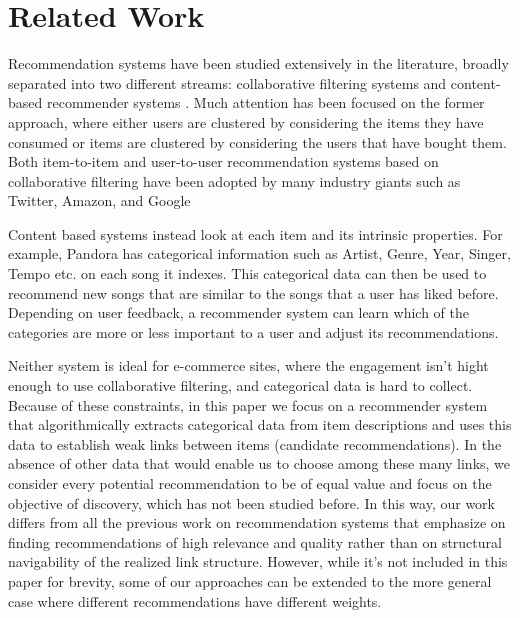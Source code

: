 \section{Related Work}

Recommendation systems have been studied extensively in the literature, %
broadly separated into two different streams: collaborative filtering systems and content-based recommender systems \cite{almazro2010survey}. Much attention has been focused on the former approach, where either users are clustered by considering the items they have consumed or items are clustered by considering the users that have bought them. Both item-to-item and user-to-user recommendation systems based on collaborative filtering have been adopted by many industry giants such as Twitter, %
Amazon, %
and Google %
\vs

Content based systems instead look at each item and its intrinsic properties. For example, Pandora has categorical information such as Artist, Genre, Year, Singer, Tempo etc. on each song it indexes. This categorical data can then be used to recommend new songs that are similar to the songs that a user has liked before. Depending on user feedback, a recommender system can learn which of the categories are more or less important to a user and adjust its recommendations. \vs

Neither system is ideal for e-commerce sites, where the engagement isn't hight enough to use collaborative filtering, and categorical data is hard to collect. Because of these constraints, in this paper we focus on a recommender system that algorithmically extracts categorical data from item descriptions and uses this data to establish weak links between items (candidate recommendations). In the absence of other data that would enable us to choose among these many links, we consider every potential recommendation to be of equal value and focus on the objective of discovery, which has not been studied before. In this way, our work differs from all the previous work on recommendation systems that emphasize on finding recommendations of high relevance and quality rather than on structural navigability of the realized link structure. However, while it's not included in this paper for brevity, some of our approaches can be extended to the more general case where different recommendations have different weights. \vs

